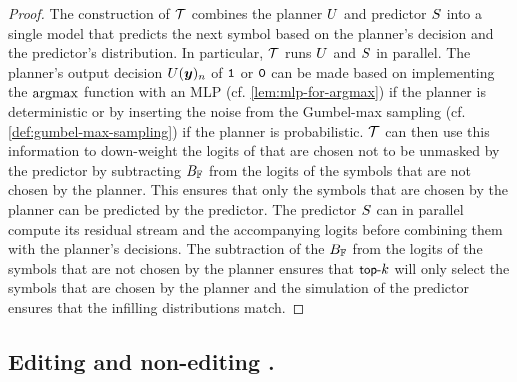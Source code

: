 \begin{proof}
   The construction of ${{\mathcal{T}}}$ combines the planner ${U}$ and predictor ${S}$ into a single model that predicts the next symbol based on the planner's decision and the predictor's distribution.
   In particular, ${{\mathcal{T}}}$ runs ${U}$ and ${S}$ in parallel. 
   The planner's output decision ${U}({{\boldsymbol{y}}})_{{n}}$ of ${\texttt{1}}$ or ${\texttt{0}}$ can be made based on implementing the $\operatorname*{{{argmax}}}$ function with an MLP (cf. \cref{lem:mlp-for-argmax}) if the planner is deterministic or by inserting the noise from the Gumbel-max sampling (cf. \cref{def:gumbel-max-sampling}) if the planner is probabilistic.
   ${{\mathcal{T}}}$ can then use this information to  down-weight the logits of that are chosen not to be unmasked by the predictor by subtracting ${{B_{{{\mathbb{F}}}}}}$ from the logits of the symbols that are not chosen by the planner.
   This ensures that only the symbols that are chosen by the planner can be predicted by the predictor.
   The predictor ${S}$ can in parallel compute its residual stream and the accompanying logits before combining them with the planner's decisions. 
   The subtraction of the ${{B_{{{\mathbb{F}}}}}}$ from the logits of the symbols that are not chosen by the planner ensures that ${{\textnormal{{\small \textsf{top-}}}k}}$ will only select the symbols that are chosen by the planner and the simulation of the predictor ensures that the infilling distributions match.
\end{proof}


\subsection{Editing and non-editing \MDMsAcr.} \label{app:editing-mdms}

